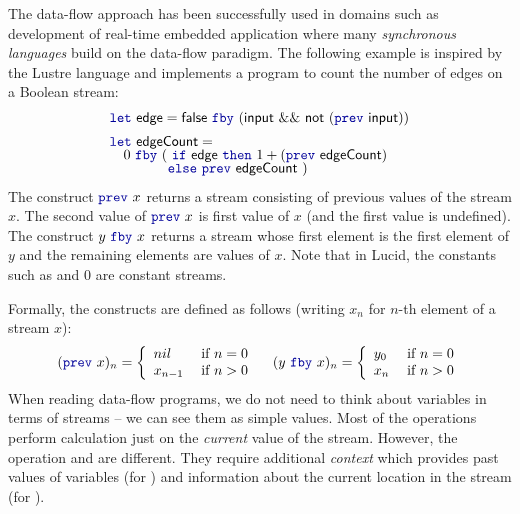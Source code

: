 The data-flow approach has been successfully used in domains such as development of real-time embedded 
application where many \emph{synchronous languages} \cite{app-synchronous-lang} build on the data-flow
paradigm. The following example is inspired by the Lustre \cite{app-synchronous-lustre} language
and implements a program to count the number of edges on a Boolean stream:
%
\begin{equation*}
\begin{array}{l}
\kvd{let}~\ident{edge} = \ident{false}~\kvd{fby}~(\ident{input}~\&\&~\ident{not}~(\kvd{prev}~\ident{input}))
\\[0.5em]
\kvd{let}~\ident{edgeCount} = \\[-0.25em]
\quad 0~\kvd{fby}~ (~\kvd{if}~\ident{edge}~\kvd{then}~1 + (\kvd{prev}~\ident{edgeCount})\\[-0.25em]
\quad\quad\quad~~~\, \kvd{else}~\kvd{prev}~\ident{edgeCount} ~)
\end{array}
\end{equation*}
%
The construct $\kvd{prev}~x$ returns a stream consisting of previous values of the stream 
$x$. The second value of $\kvd{prev}~x$ is first value of $x$ (and the first
value is undefined). The construct $y~\kvd{fby}~x$ returns a stream whose first element is the 
first element of $y$ and the remaining elements are values of $x$. Note that in Lucid, the constants
such as  and $0$ are constant streams. 

Formally, the constructs are defined as follows (writing $x_n$ for $n$-th element of a stream $x$):
%
\[ 
(\kvd{prev}~x)_n = \left\{ 
  \begin{array}{ll}
    nil     & \; \text{if $n=0$}\\
    x_{n-1} & \; \text{if $n>0$}
  \end{array} \right.
\quad
(y~\kvd{fby}~x)_n = \left\{ 
  \begin{array}{ll}
    y_0     & \; \text{if $n=0$}\\
    x_n     & \; \text{if $n>0$}
  \end{array} \right.
\]  
%
When reading data-flow programs, we do not need to think about variables in terms of streams --
we can see them as simple values. Most of the operations perform calculation just on the 
\emph{current} value of the stream. However, the operation  and  are different.
They require additional \emph{context} which provides past values of variables
(for ) and information about the current location in the stream (for ). 

